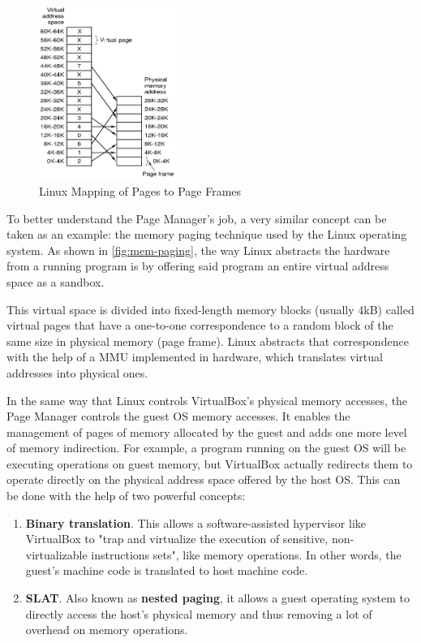 \begin{figure}
	\centering \scriptsize
	\vspace{-12pt}
	\includegraphics[width=0.40\textwidth,keepaspectratio]{art/mem-paging.png}
	\caption{Linux Mapping of Pages to Page Frames \cite{misc:mem-paging}}
	\label{fig:mem-paging}
	\vspace{-12pt}
\end{figure}
To better understand the Page Manager's job, a very similar concept can be taken as an example: the memory paging technique used by the Linux operating system. As shown in \autoref{fig:mem-paging}, the way Linux abstracts the hardware from a running program is by offering said program an entire virtual address space as a sandbox. 

This virtual space is divided into fixed-length memory blocks (usually 4kB) called virtual pages that have a one-to-one correspondence to a random block of the same size in physical memory (page frame). Linux abstracts that correspondence with the help of a \gls{MMU} implemented in hardware, which translates virtual addresses into physical ones.

In the same way that Linux controls VirtualBox's physical memory accesses, the Page Manager controls the guest OS memory accesses. It enables the management of pages of memory allocated by the guest and adds one more level of memory indirection. For example, a program running on the guest OS will be executing operations on guest memory, but VirtualBox actually redirects them to operate directly on the physical address space offered by the host OS. This can be done with the help of two powerful concepts:
\begin{enumerate}
	\item \textbf{Binary translation}. This allows a software-assisted hypervisor like VirtualBox to "trap and virtualize the execution of sensitive, non-virtualizable instructions sets"\cite{online:virtualization}, like memory operations. In other words, the guest's machine code is translated to host machine code.
	\item \textbf{\gls{SLAT}}. Also known as \textbf{nested paging}, it allows a guest operating system to directly access the host's physical memory and thus removing a lot of overhead on memory operations.
\end{enumerate} 

